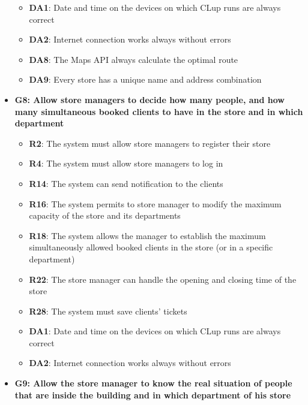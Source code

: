 \documentclass{article}
\begin{document}
\begin{itemize}
\begin{itemize}
						\item {\bfseries DA1}: Date and time on the devices on which CLup runs are always correct
						\item {\bfseries DA2}: Internet connection works always without errors
						\item {\bfseries DA8}: The Maps API always calculate the optimal route 
						\item {\bfseries DA9}: Every store has a unique name and address combination
							
					\end{itemize}	

				\item {\bfseries G8: Allow store managers to decide how many people, and how many simultaneous booked clients to have in the store and in which department}	

					\begin{itemize}
						
						\item {\bfseries R2}: The system must allow store managers to register their store
						\item {\bfseries R4}: The system must allow store managers to log in
						\item {\bfseries R14}: The system can send notification to the clients
						\item {\bfseries R16}: The system permits to store manager to modify the maximum capacity of the store and its departments
						\item {\bfseries R18}: The system allows the manager to establish the maximum simultaneously allowed booked clients in the store (or in a specific department)
						\item {\bfseries R22}: The store manager can handle the opening and closing time of the store
						\item {\bfseries R28}: The system must save clients’ tickets \\
		
						\item {\bfseries DA1}: Date and time on the devices on which CLup runs are always correct
						\item {\bfseries DA2}: Internet connection works always without errors
						
					\end{itemize}	

				\item {\bfseries G9: Allow the store manager to know the real situation of people that are inside the building and in which department of his store}	


\end{itemize}
\end{document}

